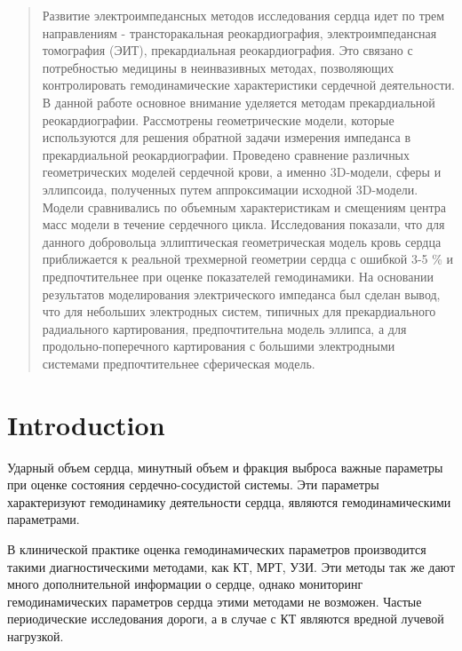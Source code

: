 \documentclass[conference]{IEEEtran}
\begin{document}
\begin{abstract}
    Развитие электроимпедансных методов исследования сердца идет по трем направлениям - трансторакальная реокардиография, электроимпедансная томография (ЭИТ), прекардиальная реокардиография. Это связано с потребностью медицины в неинвазивных методах, позволяющих контролировать гемодинамические характеристики сердечной деятельности.
    В данной работе основное внимание уделяется методам прекардиальной реокардиографии.
    Рассмотрены геометрические модели, которые используются для решения обратной задачи измерения импеданса в прекардиальной реокардиографии.
    Проведено сравнение различных геометрических моделей сердечной крови, а именно 3D-модели, сферы и эллипсоида, полученных путем аппроксимации исходной 3D-модели.
    Модели сравнивались по объемным характеристикам и смещениям центра масс модели в течение сердечного цикла.
    Исследования показали, что для данного добровольца эллиптическая геометрическая модель кровь сердца приближается к реальной трехмерной геометрии сердца с ошибкой 3-5 \% и предпочтительнее при оценке показателей гемодинамики.
    На основании результатов моделирования электрического импеданса был сделан вывод, что для небольших электродных систем, типичных для прекардиального радиального картирования, предпочтительна модель эллипса, а для продольно-поперечного картирования с большими электродными системами предпочтительнее сферическая модель.
\end{abstract}

\begin{IEEEkeywords}
\end{IEEEkeywords}

\section{Introduction}

Ударный объем сердца, минутный объем и фракция выброса важные параметры при оценке состояния сердечно-сосудистой системы.
Эти параметры характеризуют гемодинамику деятельности сердца, являются гемодинамическими параметрами.

В клинической практике оценка гемодинамических параметров производится такими диагностическими методами, как КТ, МРТ, УЗИ.
Эти методы так же дают много дополнительной информации о сердце, однако мониторинг гемодинамических параметров сердца этими методами не возможен.
Частые периодические исследования дороги, а в случае с КТ являются вредной лучевой нагрузкой.
\end{document}
